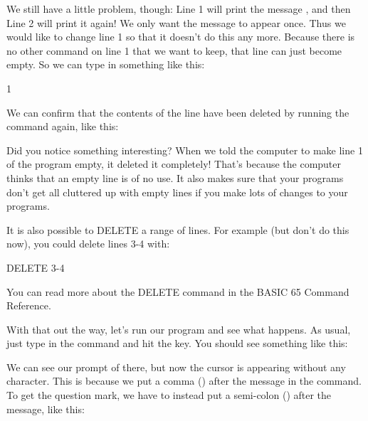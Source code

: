 
\needspace{3cm}
We still have a little problem, though: Line 1 will print the message
, and then Line 2 will print it again!
We only want the message to appear once. Thus we would like to change
line 1 so that it doesn't do this any more.  Because there is no other
command on line 1 that we want to keep, that line can just become
empty. So we can type in something like this:

\begin{screenoutput}
1
\end{screenoutput}

\needspace{4cm}
We can confirm that the contents of the line have been deleted by
running the  command again, like this:


Did you notice something interesting? When we told the computer to
make line 1 of the program empty, it deleted it completely!
That's because the computer thinks that an empty line is of no use.
It also makes sure that your programs don't get all cluttered up
with empty lines if you make lots of changes to your programs.

It is also possible to DELETE a range of lines. For example (but don't do this now), you could delete lines 3-4 with:

\begin{screenoutput}
  DELETE 3-4
\end{screenoutput}

You can read more about the DELETE command in the BASIC 65 Command Reference.

\needspace{4cm}
With that out the way, let's run our program and see what happens.
As usual, just type in the  command and hit the
 key.  You should see something like this:


\needspace{2.5cm}
We can see our prompt of  there, but
now the cursor is appearing without any  character. This is
because we put a comma (\stw{,}) after the message in the 
command.  To get the question mark, we have to instead put a
semi-colon (\stw{;}) after the message, like this:


